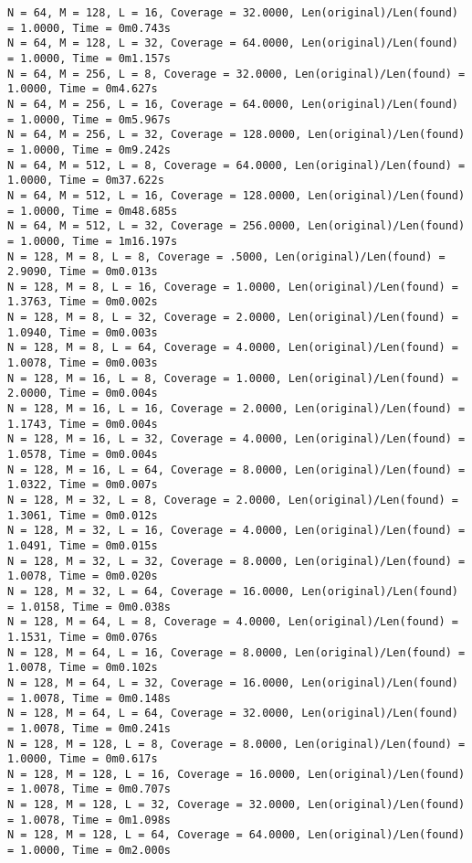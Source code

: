 \documentclass{article}
\begin{document}
{\begin{verbatim}
N = 64, M = 128, L = 16, Coverage = 32.0000, Len(original)/Len(found) = 1.0000, Time = 0m0.743s
N = 64, M = 128, L = 32, Coverage = 64.0000, Len(original)/Len(found) = 1.0000, Time = 0m1.157s
N = 64, M = 256, L = 8, Coverage = 32.0000, Len(original)/Len(found) = 1.0000, Time = 0m4.627s
N = 64, M = 256, L = 16, Coverage = 64.0000, Len(original)/Len(found) = 1.0000, Time = 0m5.967s
N = 64, M = 256, L = 32, Coverage = 128.0000, Len(original)/Len(found) = 1.0000, Time = 0m9.242s
N = 64, M = 512, L = 8, Coverage = 64.0000, Len(original)/Len(found) = 1.0000, Time = 0m37.622s
N = 64, M = 512, L = 16, Coverage = 128.0000, Len(original)/Len(found) = 1.0000, Time = 0m48.685s
N = 64, M = 512, L = 32, Coverage = 256.0000, Len(original)/Len(found) = 1.0000, Time = 1m16.197s
N = 128, M = 8, L = 8, Coverage = .5000, Len(original)/Len(found) = 2.9090, Time = 0m0.013s
N = 128, M = 8, L = 16, Coverage = 1.0000, Len(original)/Len(found) = 1.3763, Time = 0m0.002s
N = 128, M = 8, L = 32, Coverage = 2.0000, Len(original)/Len(found) = 1.0940, Time = 0m0.003s
N = 128, M = 8, L = 64, Coverage = 4.0000, Len(original)/Len(found) = 1.0078, Time = 0m0.003s
N = 128, M = 16, L = 8, Coverage = 1.0000, Len(original)/Len(found) = 2.0000, Time = 0m0.004s
N = 128, M = 16, L = 16, Coverage = 2.0000, Len(original)/Len(found) = 1.1743, Time = 0m0.004s
N = 128, M = 16, L = 32, Coverage = 4.0000, Len(original)/Len(found) = 1.0578, Time = 0m0.004s
N = 128, M = 16, L = 64, Coverage = 8.0000, Len(original)/Len(found) = 1.0322, Time = 0m0.007s
N = 128, M = 32, L = 8, Coverage = 2.0000, Len(original)/Len(found) = 1.3061, Time = 0m0.012s
N = 128, M = 32, L = 16, Coverage = 4.0000, Len(original)/Len(found) = 1.0491, Time = 0m0.015s
N = 128, M = 32, L = 32, Coverage = 8.0000, Len(original)/Len(found) = 1.0078, Time = 0m0.020s
N = 128, M = 32, L = 64, Coverage = 16.0000, Len(original)/Len(found) = 1.0158, Time = 0m0.038s
N = 128, M = 64, L = 8, Coverage = 4.0000, Len(original)/Len(found) = 1.1531, Time = 0m0.076s
N = 128, M = 64, L = 16, Coverage = 8.0000, Len(original)/Len(found) = 1.0078, Time = 0m0.102s
N = 128, M = 64, L = 32, Coverage = 16.0000, Len(original)/Len(found) = 1.0078, Time = 0m0.148s
N = 128, M = 64, L = 64, Coverage = 32.0000, Len(original)/Len(found) = 1.0078, Time = 0m0.241s
N = 128, M = 128, L = 8, Coverage = 8.0000, Len(original)/Len(found) = 1.0000, Time = 0m0.617s
N = 128, M = 128, L = 16, Coverage = 16.0000, Len(original)/Len(found) = 1.0078, Time = 0m0.707s
N = 128, M = 128, L = 32, Coverage = 32.0000, Len(original)/Len(found) = 1.0078, Time = 0m1.098s
N = 128, M = 128, L = 64, Coverage = 64.0000, Len(original)/Len(found) = 1.0000, Time = 0m2.000s

\end{verbatim}}
\end{document}
